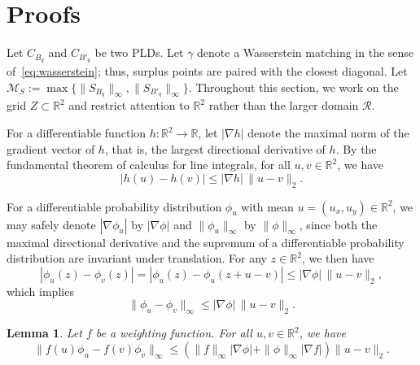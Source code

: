 \documentclass{article}
\newcommand{\R}{\mathbb{R}}
\newtheorem{lemma}[theorem]{Lemma}
\begin{document}
\newpage






\appendix

\section{Proofs}\label{sec:proofs}

Let $C_{B_q}$ and $C_{B'_q}$ be two PLDs. Let $\gamma$ denote a Wasserstein matching in the sense of~\eqref{eq:wasserstein}; thus, surplus points are paired with the closest diagonal. Let $\mathcal M_S:=\max\{\|S_{B_q}\|_\infty,\|S_{B'_q}\|_\infty\}$.
Throughout this section, we work on the grid $Z\subset\R^2$ and restrict attention to $\R^2$ rather than the larger domain $\mathcal R$.

For a differentiable function \( h : \R^2 \to \R \), let \( |\nabla h| \) denote the maximal norm of the gradient vector of \( h \), that is, the largest directional derivative of \( h \). By the fundamental theorem of calculus for line integrals, for all \( u, v \in \R^2 \), we have
\[
|h(u) - h(v)| \leq |\nabla h| \, \|u - v\|_2.
\]

For a differentiable probability distribution \( \phi_u \) with mean \( u = (u_x, u_y) \in \R^2 \), we may safely denote \( |\nabla \phi_u| \) by \( |\nabla \phi| \) and \( \|\phi_u\|_{\infty} \) by \( \|\phi\|_{\infty} \), since both the maximal directional derivative and the supremum of a differentiable probability distribution are invariant under translation.  
For any \( z \in \R^2 \), we then have
\[
|\phi_u(z) - \phi_v(z)| = |\phi_u(z) - \phi_u(z + u - v)| \leq |\nabla \phi| \, \|u - v\|_2,
\]
which implies
\[
\|\phi_u - \phi_v\|_{\infty} \leq |\nabla \phi| \, \|u - v\|_2.
\]

\begin{lemma}\label{lem:wf}
Let \( f \) be a weighting function. For all \( u, v \in \R^2 \), we have
\[
\| f(u)\phi_u - f(v)\phi_v \|_{\infty} \leq \left( \|f\|_{\infty} |\nabla \phi| + \|\phi\|_{\infty} |\nabla f| \right) \|u - v\|_2.
\]
\end{lemma}
\end{document}
